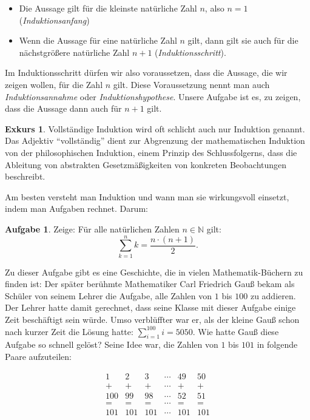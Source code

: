 \documentclass[a4paper,ngerman,12pt]{scrartcl}
\newcommand{\N}{\mathbb{N}}
\theoremstyle{definition}
\newtheorem*{aufg}{Aufgabe}
\newtheorem*{exk}{Exkurs}
\newenvironment{exkurs}{\begin{shaded}\begin{exk}}{\end{exk}\end{shaded}}
\begin{document}
\begin{itemize}
  \item Die Aussage gilt für die kleinste natürliche Zahl $n$, also $n=1$ (\emph{Induktionsanfang})
  \item Wenn die Aussage für eine natürliche Zahl $n$ gilt, dann gilt sie auch für die nächstgrößere natürliche Zahl $n+1$ (\emph{Induktionsschritt}).
\end{itemize}

Im Induktionsschritt dürfen wir also voraussetzen, dass die Aussage, die wir zeigen wollen, für die Zahl $n$ gilt. Diese Voraussetzung nennt man auch \emph{Induktionsannahme} oder \emph{Induktionshypothese}. Unsere Aufgabe ist es, zu zeigen, dass die Aussage dann auch für $n+1$ gilt.

\begin{exkurs}
  Vollständige Induktion wird oft schlicht auch nur Induktion genannt. Das Adjektiv "`vollständig"' dient zur Abgrenzung der mathematischen Induktion von der philosophischen Induktion, einem Prinzip des Schlussfolgerns, dass die Ableitung von abstrakten Gesetzmäßigkeiten von konkreten Beobachtungen beschreibt.
\end{exkurs}

Am besten versteht man Induktion und wann man sie wirkungsvoll einsetzt, indem man Aufgaben rechnet. Darum:

\begin{aufg}
  Zeige: Für alle natürlichen Zahlen $n \in \N$ gilt:
  \[ \sum\limits_{k=1}^n k = \frac{n \cdot (n+1)}{2}. \]
\end{aufg}

Zu dieser Aufgabe gibt es eine Geschichte, die in vielen Mathematik-Büchern zu finden ist: Der später berühmte Mathematiker Carl Friedrich Gauß bekam als Schüler von seinem Lehrer die Aufgabe, alle Zahlen von $1$ bis $100$ zu addieren. Der Lehrer hatte damit gerechnet, dass seine Klasse mit dieser Aufgabe einige Zeit beschäftigt sein würde. Umso verblüffter war er, als der kleine Gauß schon nach kurzer Zeit die Lösung hatte: $\sum_{i=1}^{100} i = 5050$. Wie hatte Gauß diese Aufgabe so schnell gelöst? Seine Idee war, die Zahlen von $1$ bis $101$ in folgende Paare aufzuteilen:

\[
  \begin{matrix}
    1 & 2 & 3 & \cdots & 49 & 50 \\
    + & + & + & \cdots & + & + \\
    100 & 99 & 98 & \cdots & 52 & 51 \\
    = & = & = & \cdots & = & = \\
    101 & 101 & 101 & \cdots & 101 & 101
  \end{matrix}
\]
\end{document}
